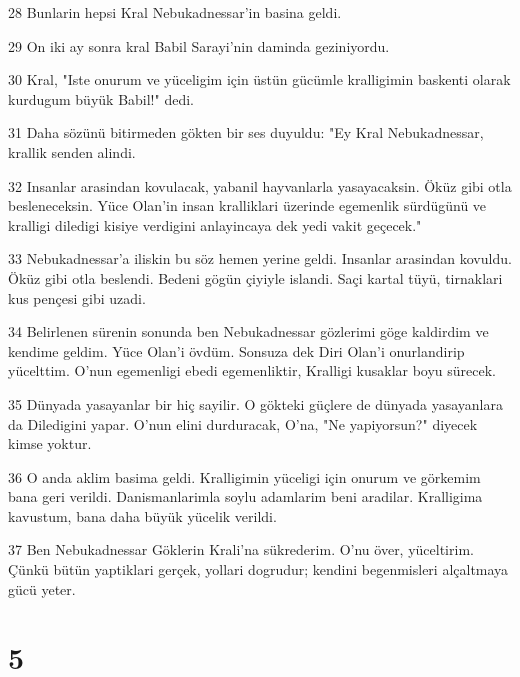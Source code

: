 \par 28 Bunlarin hepsi Kral Nebukadnessar'in basina geldi.
\par 29 On iki ay sonra kral Babil Sarayi'nin daminda geziniyordu.
\par 30 Kral, "Iste onurum ve yüceligim için üstün gücümle kralligimin baskenti olarak kurdugum büyük Babil!" dedi.
\par 31 Daha sözünü bitirmeden gökten bir ses duyuldu: "Ey Kral Nebukadnessar, krallik senden alindi.
\par 32 Insanlar arasindan kovulacak, yabanil hayvanlarla yasayacaksin. Öküz gibi otla besleneceksin. Yüce Olan'in insan kralliklari üzerinde egemenlik sürdügünü ve kralligi diledigi kisiye verdigini anlayincaya dek yedi vakit geçecek."
\par 33 Nebukadnessar'a iliskin bu söz hemen yerine geldi. Insanlar arasindan kovuldu. Öküz gibi otla beslendi. Bedeni gögün çiyiyle islandi. Saçi kartal tüyü, tirnaklari kus pençesi gibi uzadi.
\par 34 Belirlenen sürenin sonunda ben Nebukadnessar gözlerimi göge kaldirdim ve kendime geldim. Yüce Olan'i övdüm. Sonsuza dek Diri Olan'i onurlandirip yücelttim. O'nun egemenligi ebedi egemenliktir, Kralligi kusaklar boyu sürecek.
\par 35 Dünyada yasayanlar bir hiç sayilir. O gökteki güçlere de dünyada yasayanlara da Diledigini yapar. O'nun elini durduracak, O'na, "Ne yapiyorsun?" diyecek kimse yoktur.
\par 36 O anda aklim basima geldi. Kralligimin yüceligi için onurum ve görkemim bana geri verildi. Danismanlarimla soylu adamlarim beni aradilar. Kralligima kavustum, bana daha büyük yücelik verildi.
\par 37 Ben Nebukadnessar Göklerin Krali'na sükrederim. O'nu över, yüceltirim. Çünkü bütün yaptiklari gerçek, yollari dogrudur; kendini begenmisleri alçaltmaya gücü yeter.

\chapter{5}

